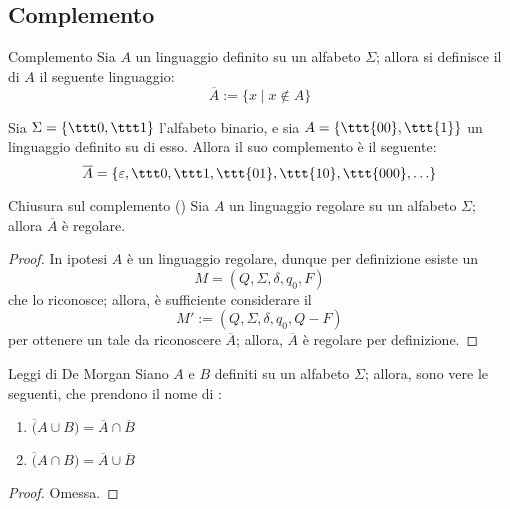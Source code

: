 \documentclass[a4paper, 12pt]{report}
\begin{document}
    \subsection{Complemento}

    \begin{frameddefn}{Complemento}
        Sia $A$ un linguaggio definito su un alfabeto $\Sigma$; allora si definisce il  di $A$ il seguente linguaggio: $$\overline A := \{x \mid x \notin A\}$$
    \end{frameddefn}

    \begin{example}[Complemento]
        Sia $\Sigma = \{\ttt 0, \ttt 1\}$ l'alfabeto binario, e sia $A = \{ \ttt{00}, \ttt{1}\}$ un linguaggio definito su di esso. Allora il suo complemento è il seguente: $$\overline A = \{\varepsilon, \ttt 0, \ttt 1, \ttt{01}, \ttt{10}, \ttt{000}, \ldots\}$$
    \end{example}

    \begin{framedprop}[label={closure compl}]{Chiusura sul complemento (\REG)}
        Sia $A$ un linguaggio regolare su un alfabeto $\Sigma$; allora $\overline A$ è regolare.
    \end{framedprop}

    \begin{proof}
        In ipotesi $A$ è un linguaggio regolare, dunque per definizione esiste un \DFA $$M = (Q, \Sigma, \delta, q_0, F)$$ che lo riconosce; allora, è sufficiente considerare il \DFA $$M' := (Q, \Sigma, \delta, q_0, Q-F)$$ per ottenere un \DFA tale da riconoscere $\overline A$; allora, $\overline A$ è regolare per definizione.
    \end{proof}

    \begin{framedprop}{Leggi di De Morgan}
        Siano $A$ e $B$ definiti su un alfabeto $\Sigma$; allora, sono vere le seguenti, che prendono il nome di :

        \begin{enumerate}[label=\roman*), font=\itshape]
            \item $\overline (A \cup B) = \overline A \cap \overline B$
            \item $\overline (A \cap B) = \overline A \cup \overline B$
        \end{enumerate}
    \end{framedprop}

    \begin{proof}
        Omessa.
    \end{proof}
\end{document}

